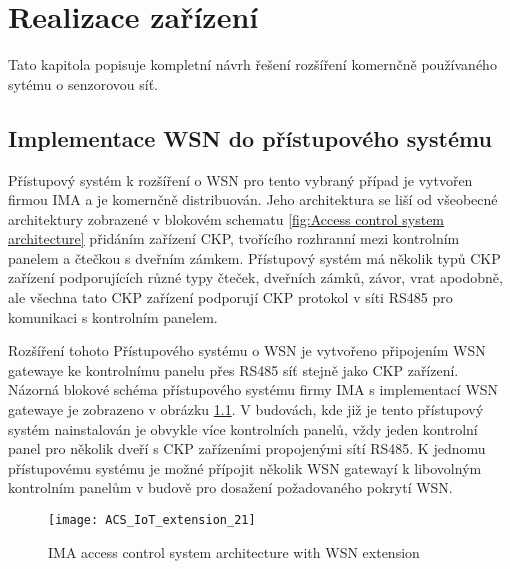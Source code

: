 \chapter{Realizace zařízení}
Tato kapitola popisuje kompletní návrh řešení rozšíření komernčně používaného sytému o senzorovou síť.



\section{Implementace WSN do přístupového systému}
\label{Implementace WSN do přístupového systému}
Přístupový systém k rozšíření o WSN pro tento vybraný případ je vytvořen firmou IMA a je komernčně distribuován. Jeho architektura se liší od všeobecné architektury zobrazené v blokovém schematu \ref{fig:Access control system architecture} přidáním zařízení CKP, tvořícího rozhranní mezi kontrolním panelem a čtečkou s dveřním zámkem. Přístupový systém má několik typů CKP zařízení podporujících různé typy čteček, dveřních zámků, závor, vrat apodobně, ale všechna tato CKP zařízení podporují CKP protokol v síti RS485 pro komunikaci s kontrolním panelem.

Rozšíření tohoto Přístupového systému o WSN je vytvořeno připojením WSN gatewaye ke kontrolnímu panelu přes RS485 síť stejně jako CKP zařízení. Názorná blokové schéma přístupového systému firmy IMA s implementací WSN gatewaye je zobrazeno v obrázku \ref{fig:ACS architecture IMA with geteway}.
V budovách, kde již je tento přístupový systém nainstalován je obvykle více kontrolních panelů, vždy jeden kontrolní panel pro několik dveří s CKP zařízeními propojenými sítí RS485. 
K jednomu přístupovému systému je možné přípojit několik WSN gatewayí k libovolným kontrolním panelům v budově pro dosažení požadovaného pokrytí WSN.

\begin{figure}[!h]
\centering
\texttt{[image: ACS\_IoT\_extension\_21]}
\caption{IMA access control system architecture with WSN extension}
\label{fig:ACS architecture IMA with geteway}
\end{figure}


